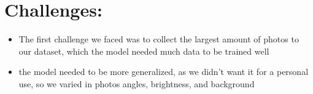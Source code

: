 \documentclass[11pt]{article}
\begin{document}
\section{Challenges:}
\begin{itemize}
  \item The first challenge we faced was to collect the largest amount of photos to our dataset, which the model needed much data to be trained well
  \item the model needed to be more generalized, as we didn't want it for a personal use, so we varied in photos angles, brightness, and background 

\end{itemize}
\end{document}
